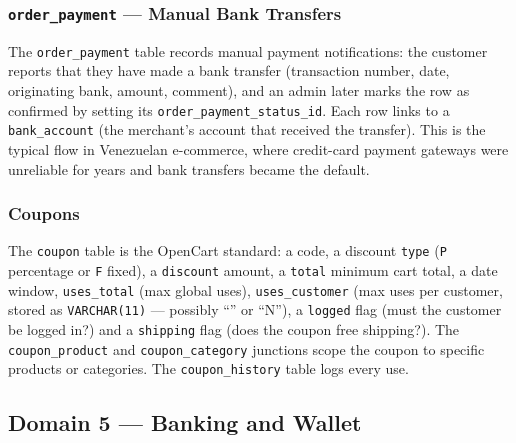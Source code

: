 \documentclass[11pt,a4paper]{article}
\begin{document}
\subsubsection{\texttt{order\_payment} --- Manual Bank Transfers}

The \texttt{order\_payment} table records manual payment
notifications: the customer reports that they have made a bank
transfer (transaction number, date, originating bank, amount,
comment), and an admin later marks the row as confirmed by
setting its \texttt{order\_payment\_status\_id}. Each row links
to a \texttt{bank\_account} (the merchant's account that
received the transfer). This is the typical flow in
Venezuelan e-commerce, where credit-card payment gateways
were unreliable for years and bank transfers became the default.

\subsubsection{Coupons}

The \texttt{coupon} table is the OpenCart standard: a code, a
discount \texttt{type} (\texttt{P} percentage or \texttt{F} fixed),
a \texttt{discount} amount, a \texttt{total} minimum cart total,
a date window, \texttt{uses\_total} (max global uses),
\texttt{uses\_customer} (max uses per customer, stored as
\texttt{VARCHAR(11)} --- possibly ``'' or ``N''), a
\texttt{logged} flag (must the customer be logged in?) and a
\texttt{shipping} flag (does the coupon free shipping?).
The \texttt{coupon\_product} and \texttt{coupon\_category}
junctions scope the coupon to specific products or categories.
The \texttt{coupon\_history} table logs every use.

\subsection{Domain 5 --- Banking and Wallet}\label{sec:payments}
\end{document}
